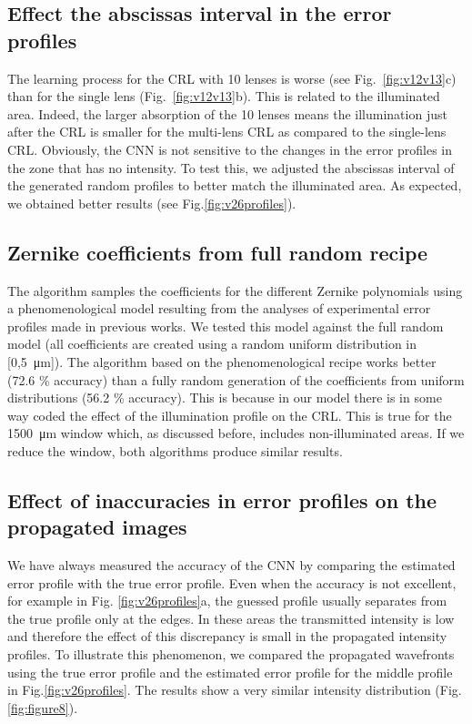 \documentclass{iucr}
\newcommand{\inred}[1]{{\color{black}#1}}
\begin{document}
\subsection{Effect the abscissas interval in the error profiles}
The learning process for the CRL with 10 lenses is worse (see Fig.~\ref{fig:v12v13}c) than for the single lens (Fig.~\ref{fig:v12v13}b). This is related to the illuminated area. Indeed, the larger absorption of the 10 lenses means the illumination just after the CRL is smaller for the multi-lens CRL as compared to the single-lens CRL.
Obviously, the CNN is not sensitive to  the changes in the error profiles in the zone that has no intensity.
To test this, we adjusted the abscissas interval of the generated random profiles to better match the illuminated area. As expected, we obtained better results (see Fig.\ref{fig:v26profiles}).

\subsection{Zernike coefficients from full random recipe}
The algorithm samples the coefficients for the different Zernike polynomials using a phenomenological model resulting from the analyses of experimental error profiles made in previous works. We tested this model against the full random model (all  coefficients are created using a random uniform distribution in [0,\SI{5}{\micro\meter}]). The algorithm based on the phenomenological recipe works better (\inred{72.6 \%} accuracy) than a fully random generation of the coefficients from uniform distributions (\inred{56.2 \%} accuracy).
This is because in our model there is in some way coded the effect of the illumination profile on the CRL.
This is true for the \SI{1500}{\micro\meter} window which, as discussed before, includes non-illuminated areas. If we reduce the window, both algorithms produce similar results. 

\subsection{Effect of inaccuracies in error profiles on the propagated images}
We have always measured the accuracy of the CNN by comparing the \inred{estimated} error profile with the true error profile. Even when the accuracy is not excellent, for example in Fig. \ref{fig:v26profiles}a, the guessed profile usually separates from the true profile only at the edges. In these areas the transmitted intensity is low and therefore the effect of this discrepancy is small in the propagated intensity profiles.
To illustrate this phenomenon, we compared the propagated wavefronts using the true error profile and the estimated error profile for the middle profile in Fig.\ref{fig:v26profiles}.
The results show a very similar intensity distribution (Fig. \ref{fig:figure8}).
\end{document}
